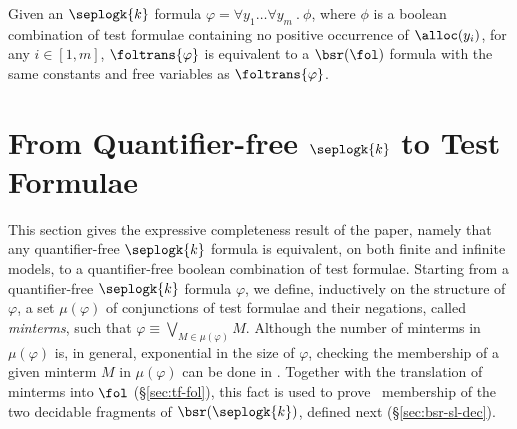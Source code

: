 \begin{lemma}\label{lem:bsrfoltrans}
Given an $\seplogk{k}$ formula $\varphi = \forall y_1 \ldots \forall
y_m ~.~ \phi$, where $\phi$ is a boolean combination of test formulae
containing no positive occurrence of $\alloc(y_i)$, for any $i \in
[1,m]$, $\foltrans{\varphi}$ is equivalent to a $\bsr(\fol)$ formula
with the same constants and free variables as
$\foltrans{\varphi}$.
\end{lemma}

\section{From Quantifier-free $\seplogk{k}$ to Test Formulae}
\label{sec:spatial-elim}

This section gives the expressive completeness result of the paper,
namely that any quantifier-free $\seplogk{k}$ formula is equivalent,
on both finite and infinite models, to a quantifier-free boolean
combination of test formulae. Starting from a quantifier-free
$\seplogk{k}$ formula $\varphi$, we define, inductively on the
structure of $\varphi$, a set $\mu(\varphi)$ of conjunctions of test
formulae and their negations, called \emph{minterms}, such that
$\varphi \equiv \bigvee_{M \in \mu(\varphi)} M$. Although the number
of minterms in $\mu(\varphi)$ is, in general, exponential in the size
of $\varphi$, checking the membership of a given minterm $M$ in
$\mu(\varphi)$ can be done in \pspace. Together with the translation
of minterms into $\fol$ (\S\ref{sec:tf-fol}), this fact is used to
prove \pspace\ membership of the two decidable fragments of
$\bsr(\seplogk{k})$, defined next (\S\ref{sec:bsr-sl-dec}).

